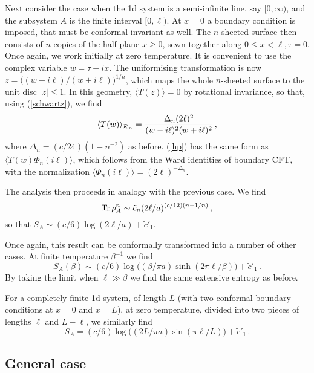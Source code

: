 \documentclass{ws-ijqi}
\begin{document}
Next consider the case when the 1d system is a semi-infinite line,
say $[0,\infty)$, and the subsystem $A$ is the finite interval
$[0,\ell)$. 
At $x=0$ a boundary condition is imposed, that must be conformal invariant 
as well.
The $n$-sheeted surface then consists of $n$ copies
of the half-plane $x\geq0$, sewn together along $0\leq x<\ell, \tau=0$.
Once again, we work initially at zero temperature. It is convenient
to use the complex variable $w=\tau+ix$. The uniformising transformation
is now $z=\big((w-i\ell)/(w+i\ell)\big)^{1/n}$, which maps the whole
$n$-sheeted surface to the unit disc $|z|\leq1$. In this geometry, 
$\langle T(z)\rangle=0$ by rotational invariance, so that, using 
(\ref{schwartz}), we find
\begin{equation}
\label{hp}
\langle T(w)\rangle_{{\cal R}_n}=
{\Delta_n(2\ell)^2\over(w-i\ell)^2(w+i\ell)^2}\,,
\end{equation}
where $\Delta_n=(c/24)(1-n^{-2})$ as before. 
(\ref{hp}) has the same form as $\langle T(w)\Phi_n(i\ell)\rangle$,
which follows from the Ward identities of boundary CFT,\cite{confbook} 
with the normalization $\langle\Phi_n(i\ell)\rangle=(2\ell)^{-\Delta_n}$. 

The analysis then proceeds in analogy with the previous case. We find
\begin{equation}
{\rm Tr}\,\rho_{A}^n\sim \tilde c_n(2\ell/a)^{(c/12)(n-1/n)}\,,
\end{equation}
so that
$S_A\sim(c/6)\log(2\ell/a)+{\tilde c}'_1$. 

Once again, this result can be conformally transformed into a number of
other cases. At finite temperature $\beta^{-1}$ we find
\begin{equation}
S_A(\beta)\sim(c/6)\log\big((\beta/\pi a)\sinh(2\pi\ell/\beta)\big)+
{\tilde c}'_1\,.
\end{equation}
By taking the limit when $\ell\gg\beta$ we find the same extensive
entropy as before. 

For a completely finite 1d system, of length $L$ (with two conformal boundary 
conditions at $x=0$ and $x=L$), at zero temperature, divided into two pieces 
of lengths $\ell$ and $L-\ell$, we similarly find
\begin{equation}
S_A=(c/6)\log\big((2L/\pi a)\sin(\pi\ell/L)\big)+{\tilde c}'_1\,.
\end{equation}

\subsection{General case}
\end{document}
